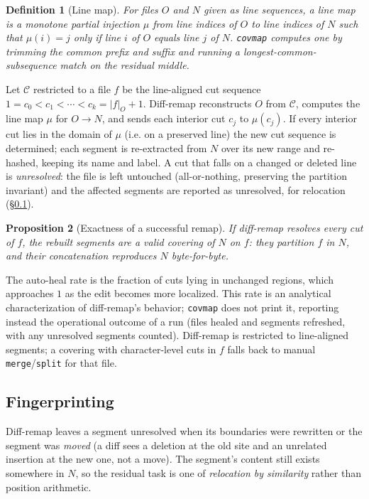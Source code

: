 \documentclass[11pt,a4paper]{article}
\newtheorem{definition}{Definition}[section]
\newtheorem{proposition}[definition]{Proposition}
\newcommand{\Cov}{\mathcal{C}}
\begin{document}
\begin{definition}[Line map]\label{def:linemap}
For files $O$ and $N$ given as line sequences, a \emph{line map} is a
monotone partial injection $\mu$ from line indices of $O$ to line
indices of $N$ such that $\mu(i) = j$ only if line $i$ of $O$ equals
line $j$ of $N$. \texttt{covmap} computes one by trimming the common
prefix and suffix and running a longest-common-subsequence match on the
residual middle.
\end{definition}

Let $\Cov$ restricted to a file $f$ be the line-aligned cut sequence
$1 = c_0 < c_1 < \cdots < c_k = |f|_O + 1$. Diff-remap reconstructs
$O$ from $\Cov$, computes the line map $\mu$ for $O \to N$, and sends
each interior cut $c_j$ to $\mu(c_j)$. If every interior cut lies in the
domain of $\mu$ (i.e. on a preserved line) the new cut sequence is
determined; each segment is re-extracted from $N$ over its new range and
re-hashed, keeping its name and label. A cut that falls on a changed or
deleted line is \emph{unresolved}: the file is left untouched
(all-or-nothing, preserving the partition invariant) and the affected
segments are reported as unresolved, for relocation (\S\ref{sec:fingerprint}).

\begin{proposition}[Exactness of a successful remap]\label{prop:remap}
If diff-remap resolves every cut of $f$, the rebuilt segments are a
valid covering of $N$ on $f$: they partition $f$ in $N$, and their
concatenation reproduces $N$ byte-for-byte.
\end{proposition}

The auto-heal rate is the fraction of cuts lying in unchanged regions,
which approaches $1$ as the edit becomes more localized. This rate is an
analytical characterization of diff-remap's behavior; \texttt{covmap}
does not print it, reporting instead the operational outcome of a run
(files healed and segments refreshed, with any unresolved segments
counted). Diff-remap is restricted to line-aligned segments; a covering
with character-level cuts in $f$ falls back to manual
\texttt{merge}/\texttt{split} for that file.

\subsection{Fingerprinting}\label{sec:fingerprint}

Diff-remap leaves a segment unresolved when its boundaries were rewritten
or the segment was \emph{moved} (a diff sees a deletion at the old site
and an unrelated insertion at the new one, not a move). The segment's
content still exists somewhere in $N$, so the residual task is one of
\emph{relocation by similarity} rather than position arithmetic.
\end{document}
